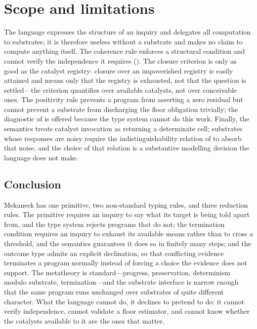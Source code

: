 \documentclass[11pt,a4paper]{article}
\theoremstyle{thmstyle}
\theoremstyle{definition}
\theoremstyle{remark}
\begin{document}
\section{Scope and limitations}
\label{sec:scope}

The language expresses the structure of an inquiry and delegates all
computation to substrates; it is therefore useless without a substrate and
makes no claim to compute anything itself. The coherence rule enforces a
structural condition and cannot verify the independence it requires
(). The closure criterion is only as good as the
catalyst registry: closure over an impoverished registry is easily attained
and means only that the registry is exhausted, not that the question is
settled---the criterion quantifies over available catalysts, not over
conceivable ones. The positivity rule prevents a program from asserting a
zero residual but cannot prevent a substrate from discharging the floor
obligation trivially; the diagnostic of  is offered
because the type system cannot do this work. Finally, the semantics treats
catalyst invocation as returning a determinate cell; substrates whose
responses are noisy require the indistinguishability relation of
 to absorb that noise, and the choice of that relation is a
substantive modelling decision the language does not make.

\subsection{Conclusion}

Mekaneck has one primitive, two non-standard typing rules, and three
reduction rules. The primitive requires an inquiry to say what its target is
being told apart from, and the type system rejects programs that do not; the
termination condition requires an inquiry to exhaust its available means
rather than to cross a threshold, and the semantics guarantees it does so in
finitely many steps; and the outcome type admits an explicit declination, so
that conflicting evidence terminates a program normally instead of forcing a
choice the evidence does not support. The metatheory is standard---progress,
preservation, determinism modulo substrate, termination---and the substrate
interface is narrow enough that the same program runs unchanged over
substrates of quite different character. What the language cannot do, it
declines to pretend to do: it cannot verify independence, cannot validate a
floor estimator, and cannot know whether the catalysts available to it are
the ones that matter.



\end{document}
